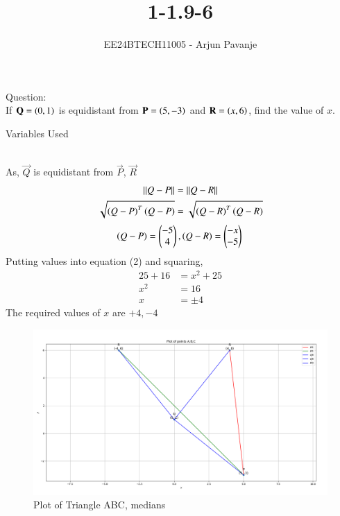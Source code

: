 \documentclass[journal]{IEEEtran}
\begin{document}

\vspace{3cm}

\title{1-1.9-6}
\author{EE24BTECH11005 - Arjun Pavanje
}
{\let\newpage\relax\maketitle}
Question:\\
If $\mathbf{Q}=\left(0,1\right)$ is equidistant from $\mathbf{P}=\left(5,-3\right)$ and $\mathbf{R}=\left(x,6\right)$, find the value of $x$.\\
\solution
\begin{table}[h!]    
  \centering
  
  \caption{Variables Used}
  \label{tab1-1.9-6}
\end{table}\\
As, $\vec{Q}$ is equidistant from $\vec{P}$, $\vec{R}$\\
\begin{align}
	\left\lVert Q-P\right\rVert &= \left\lVert Q-R\right\rVert\\
		\sqrt{\left(Q-P\right)^T\left(Q-P\right)}&=\sqrt{\left(Q-R\right)^T\left(Q-R\right)}
\end{align}
$$		\left(Q-P\right) = \begin{pmatrix}
			-5\\
			4
		\end{pmatrix},
		\left(Q-R\right)=\begin{pmatrix}
			-x\\
			-5
		\end{pmatrix}\\
$$
Putting values into equation (2) and squaring,
\begin{align}
	25+16&=x^2+25\\
	x^2&=16\\
	x &= \pm{4}
\end{align}
The required values of $x$ are $+4,-4$
\begin{figure}[h!]
   \centering
   \includegraphics[width = 1\linewidth]{figs/Figure_1.png}
   \caption{Plot of Triangle ABC, medians}
   \label{stemplot}
\end{figure}
\end{document}
